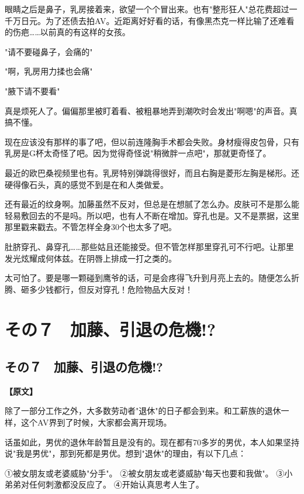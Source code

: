 \documentclass[12pt,UTF8]{ctexbook}
\begin{document}
{{眼睛之后是鼻子，乳房接着来，欲望一个个冒出来。也有"整形狂人"总花费超过一千万日元。为了还债去拍AV。近距离好好看的话，有像黑杰克一样比输了还难看的伤疤……以前真的有这样的女孩。

"请不要碰鼻子，会痛的"

"啊，乳房用力揉也会痛"

"腋下请不要看"

真是烦死人了。偏偏那里被盯着看、被粗暴地弄到潮吹时会发出"啊嗯"的声音。真搞不懂。

现在应该没有那样的事了吧，但以前连隆胸手术都会失败。身材瘦得皮包骨，只有乳房是G杯太奇怪了吧。因为觉得奇怪说"稍微胖一点吧"，那就更奇怪了。

最近的欧巴桑视频里也有。乳房特别弹跳得很好，而且右胸是菱形左胸是梯形。还硬得像石头，真的感觉不到是在和人类做爱。

还有最近的纹身啊。加藤虽然不反对，但总是在想腻了怎么办。皮肤可不是那么能轻易敷回去的不是吗。所以吧，也有人不断在增加。穿孔也是。又不是票据，这里那里戳来戳去。不管怎样全身30个也太多了吧。

肚脐穿孔、鼻穿孔……那些姑且还能接受。但不管怎样那里穿孔可不行吧。让那里发光炫耀成何体兹。在阴唇上排成一打之类的。

太可怕了。要是哪一颗碰到鹰爷的话，可是会疼得飞升到月亮上去的。随便怎么折腾、砸多少钱都行，但反对穿孔！危险物品大反对！
}

\chapter{その７　加藤、引退の危機!?}
\label{chap:07}

\section{その７　加藤、引退の危機!?}

\vspace{1ex}
\parbox{0.9\linewidth}{
\textbf{【原文】}\par

除了一部分工作之外，大多数劳动者"退休"的日子都会到来。和工薪族的退休一样，这个AV界到了时候，大家都会离开现场。

话虽如此，男优的退休年龄暂且是没有的。现在都有70多岁的男优，本人如果坚持说"我是男优"，那到死都是男优。想到"退休"的理由，有以下几点：

①被女朋友或老婆威胁"分手"。
②被女朋友或老婆威胁"每天也要和我做"。
③小弟弟对任何刺激都没反应了。
④开始认真思考人生了。

}}
\end{document}
